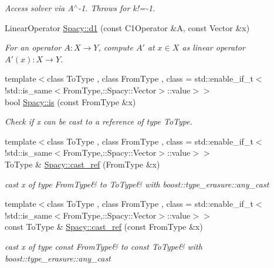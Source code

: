 \begin{DoxyCompactItemize}
\begin{DoxyCompactList}\small\item\em Access solver via A$^\wedge$-\/1. Throws for k!=-\/1. \end{DoxyCompactList}\item 
Linear\+Operator \hyperlink{group__SpacyGroup_ga2205e2a2c4bb5242665bbc09929d35d2_ga2205e2a2c4bb5242665bbc09929d35d2}{Spacy\+::d1} (const C1\+Operator \&A, const Vector \&x)
\begin{DoxyCompactList}\small\item\em For an operator $ A: X\to Y $, compute $A'$ at $x\in X$ as linear operator $ A'(x): X \to Y $. \end{DoxyCompactList}\item 
{\footnotesize template$<$class To\+Type , class From\+Type , class  = std\+::enable\+\_\+if\+\_\+t$<$!std\+::is\+\_\+same$<$\+From\+Type,\+::\+Spacy\+::\+Vector$>$\+::value$>$$>$ }\\bool \hyperlink{group__SpacyGroup_ga16b67d1bc0157426af3ee1e91afcf728_ga16b67d1bc0157426af3ee1e91afcf728}{Spacy\+::is} (const From\+Type \&x)
\begin{DoxyCompactList}\small\item\em Check if x can be cast to a reference of type To\+Type. \end{DoxyCompactList}\item 
{\footnotesize template$<$class To\+Type , class From\+Type , class  = std\+::enable\+\_\+if\+\_\+t$<$!std\+::is\+\_\+same$<$\+From\+Type,\+::\+Spacy\+::\+Vector$>$\+::value$>$$>$ }\\To\+Type \& \hyperlink{group__SpacyGroup_gaf74aa266d04acaba7263ee8d36b5b906_gaf74aa266d04acaba7263ee8d36b5b906}{Spacy\+::cast\+\_\+ref} (From\+Type \&x)
\begin{DoxyCompactList}\small\item\em cast x of type \textquotesingle{}From\+Type\&\textquotesingle{} to \textquotesingle{}To\+Type\&\textquotesingle{} with boost\+::type\+\_\+erasure\+::any\+\_\+cast \end{DoxyCompactList}\item 
{\footnotesize template$<$class To\+Type , class From\+Type , class  = std\+::enable\+\_\+if\+\_\+t$<$!std\+::is\+\_\+same$<$\+From\+Type,\+::\+Spacy\+::\+Vector$>$\+::value$>$$>$ }\\const To\+Type \& \hyperlink{group__SpacyGroup_gaf03cb3abce3186570889439abac37917_gaf03cb3abce3186570889439abac37917}{Spacy\+::cast\+\_\+ref} (const From\+Type \&x)
\begin{DoxyCompactList}\small\item\em cast x of type \textquotesingle{}const From\+Type\&\textquotesingle{} to \textquotesingle{}const To\+Type\&\textquotesingle{} with boost\+::type\+\_\+erasure\+::any\+\_\+cast \end{DoxyCompactList}\item 

\end{DoxyCompactItemize}
